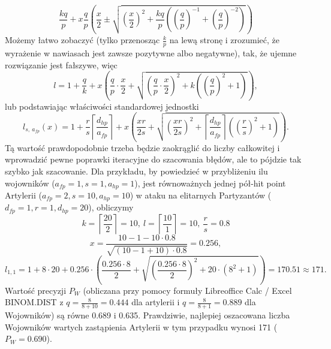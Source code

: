 \documentclass{article}
\begin{document}
\begin{equation*}
    \frac{kq}{p} + x\frac{q}{p}\left(\frac{x}{2}\pm\sqrt{
    \left(\frac{x}{2}\right)^2 + \frac{kq}{p}\left(
    \left(\frac{q}{p}\right)^{-1} + \left(\frac{q}{p}\right)^{-2}\right)
    }\right)
\end{equation*}
Możemy łatwo zobaczyć (tylko przenosząc $\frac{k}{p}$ na lewą stronę i zrozumieć, że wyrażenie w nawiasach jest zawsze pozytywne albo negatywne), tak, że ujemne rozwiązanie jest fałszywe, więc
\begin{equation*}
    l = 1+\frac{q}{k}+x\left(\frac{q}{p}\cdot\frac{x}{2}+\sqrt{
    \left(\frac{q}{p}\cdot\frac{x}{2}\right)^2 +k\left(\left(\frac{q}{p}\right)^2+1\right)
    }\right),
\end{equation*}
lub podstawiając właściwości standardowej jednostki
\begin{equation*}
    l_{s, \:a_{fp}}(x)= 1 + \frac{r}{s}\left\lceil\frac{d_{hp}}{a_{fp}}\right\rceil+x\left(
    \frac{xr}{2s} +\sqrt{
    \left(\frac{xr}{2s}\right)^2 + \left\lceil\frac{d_{hp}}{a_{fp}}\right\rceil\left(\left(\frac{r}{s}\right)^2+1\right)
    }\right).
\end{equation*}
Tą wartość prawdopodobnie trzeba będzie zaokrąglić do liczby całkowitej i wprowadzić pewne poprawki iteracyjne do szacowania błędów, ale to pójdzie tak szybko jak szacowanie. Dla przykładu, by powiedzieć w przybliżeniu ilu wojowników ($a_{fp} = 1, s = 1, a_{hp} = 1$), jest równoważnych jednej pół-hit point Artylerii ($a_{fp} = 2, s = 10, a_{hp} = 10$) w ataku na elitarnych Partyzantów ($d_{fp} = 1, r = 1, d_{hp} = 20$), obliczymy
\begin{equation*}
    k = \left\lceil\frac{20}{2}\right\rceil = 10,\: l = \left\lceil\frac{10}{1}\right\rceil = 10, \: \frac{r}{s} = 0.8
\end{equation*}
\begin{equation*}
    x = \frac{10 - 1 - 10 \cdot 0.8}{\sqrt{(10-1+10)\cdot 0.8}} = 0.256,
\end{equation*}
\begin{equation*}
l_{1,1}=1+8\cdot20+0.256\cdot(\frac{0.256\cdot8}{2}+\sqrt{
(\frac{0.256\cdot8}{2})^2+20\cdot(8^2+1)}) = 170.51 \approx 171.
\end{equation*}
Wartość precyzji $P_W$ (obliczana przy pomocy formuły Libreoffice Calc / Excel BINOM.DIST z $q=\frac{8}{8+10}=0.444$ dla artylerii i $q=\frac{8}{8+1}=0.889$ dla Wojowników) są równe 0.689 i 0.635. Prawdziwie, najlepiej oszacowana liczba Wojowników wartych zastąpienia Artylerii w tym przypadku wynosi 171 ($P_W=0.690$).
\end{document}
